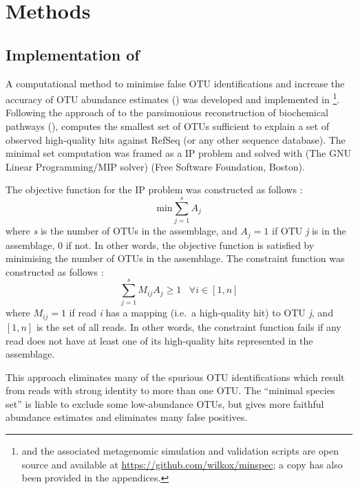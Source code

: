 \section{Methods}

\subsection{Implementation of }

A computational method to minimise false \ac{OTU} identifications and increase the accuracy of \ac{OTU} abundance estimates () was developed and implemented in \footnote{ and the associated metagenomic simulation and validation scripts are open source and available at \url{https://github.com/wilkox/minspec}; a copy has also been provided in the appendices.}.
Following the approach of \citet{Ye:2009bl} to the parsimonious reconstruction of biochemical pathways (),  computes the smallest set of \acp{OTU} sufficient to explain a set of observed high-quality hits against RefSeq (or any other sequence database).
The minimal set computation was framed as a \ac{IP} problem and solved with  (The GNU Linear Programming/MIP solver) (Free Software Foundation, Boston).

The objective function for the \ac{IP} problem was constructed as follows \citep[adapted from][]{Ye:2009bl}:
\begin{equation*}
\mathrm{min}\sum_{j=1}^{s}A_{j}
\end{equation*}
where \textit{s} is the number of \acp{OTU} in the assemblage, and $A_{j} = 1$ if \ac{OTU} \textit{j} is in the assemblage, 0 if not.
In other words, the objective function is satisfied by minimising the number of \acp{OTU} in the assemblage.
The constraint function was constructed as follows \citep[adapted from][]{Ye:2009bl}:
\begin{equation*}
\sum_{j=1}^{s}M_{ij}A_{j}\ge1 \; \; \; \forall i \in [1,n]
\end{equation*}
where $M_{ij} = 1$ if read \textit{i} has a mapping (i.e.\ a high-quality  hit) to \ac{OTU} \textit{j}, and $[1,n]$ is the set of all reads.
In other words, the constraint function fails if any read does not have at least one of its high-quality  hits represented in the assemblage.

This approach eliminates many of the spurious \ac{OTU} identifications which result from reads with strong identity to more than one \ac{OTU}.
The ``minimal species set'' is liable to exclude some low-abundance \acp{OTU}, but gives more faithful abundance estimates and eliminates many false positives.

